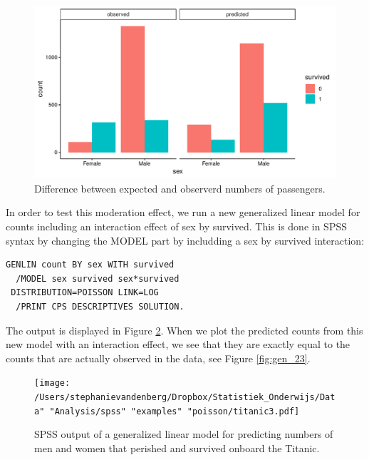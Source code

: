 \documentclass[]{book}\usepackage[]{graphicx}\usepackage[]{color}
\makeatletter
\def\maxwidth{ %
  \ifdim\Gin@nat@width>\linewidth
    \linewidth
  \else
    \Gin@nat@width
  \fi
}
\makeatother
\begin{document}
\begin{figure}

{\centering \includegraphics[width=\maxwidth]{figure/gen_22-1} 

}

\caption[Difference between expected and observerd numbers of passengers]{Difference between expected and observerd numbers of passengers.}\label{fig:gen_22}
\end{figure}




In order to test this moderation effect, we run a new generalized linear model for counts including an interaction effect of sex by survived. This is done in SPSS syntax by changing the MODEL part by includding a sex by survived interaction:


\begin{verbatim}
GENLIN count BY sex WITH survived
  /MODEL sex survived sex*survived
 DISTRIBUTION=POISSON LINK=LOG
  /PRINT CPS DESCRIPTIVES SOLUTION.
\end{verbatim}


The output is displayed in Figure \ref{fig:titanic3}. When we plot the predicted counts from this new model with an interaction effect, we see that they are exactly equal to the counts that are actually observed in the data, see Figure \ref{fig:gen_23}.


\begin{figure}[h]
    \begin{center}
       \texttt{[image: /Users/stephanievandenberg/Dropbox/Statistiek\_Onderwijs/Data" "Analysis/spss" "examples" "poisson/titanic3.pdf]}
    \end{center}
     \caption{SPSS output of a generalized linear model for predicting numbers of men and women that perished and survived onboard the Titanic.}
    \label{fig:titanic3}
\end{figure}
\end{document}
